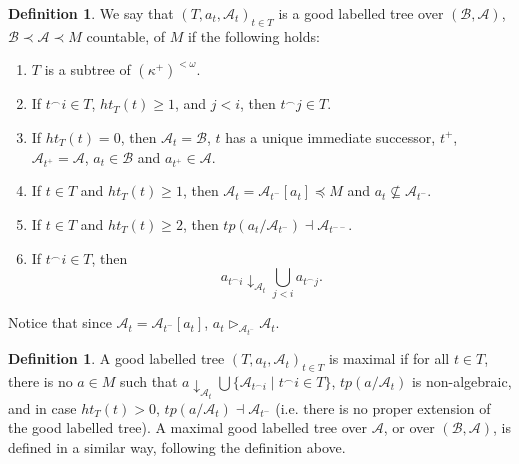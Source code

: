 \documentclass[12pt,a4paper]{amsart}
\theoremstyle{definition}
\newtheorem{defn}[thm]{Definition}
\theoremstyle{remark}
\renewcommand{\mid}{\mathrel{|}\allowbreak}
\begin{document}
\begin{defn}\label{good_labelled_tree}
    We say that $(T,a_t,\mathcal{A}_t)_{t\in T}$ is a good labelled tree over $(\mathcal{B},\mathcal{A})$, $\mathcal{B}\prec\mathcal{A}\prec M$ countable, of $M$ if the following holds:
    \begin{enumerate}
        \item $T$ is a subtree of $(\kappa^+)^{<\omega}$.
        \item If $t^\frown i\in T$, $ht_T(t)\ge 1$, and $j<i$, then $t^\frown j\in T$.
        \item If $ht_T(t)=0$, then $\mathcal{A}_{t}=\mathcal{B}$, $t$ has a unique immediate successor, $t^+$, $\mathcal{A}_{t^+}=\mathcal{A}$, $a_t\in \mathcal{B}$ and $a_{t^+}\in \mathcal{A}$.
        \item If $t\in T$ and $ht_T(t)\ge 1$, then $\mathcal{A}_t =\mathcal{A}_{t^-}[a_t]\preceq M$ and $a_t\not \subseteq\mathcal{A}_{t^-}$.
        \item If $t\in T$ and $ht_T(t)\ge 2$, then $tp(a_t / \mathcal{A}_{t^-})\dashv \mathcal{A}_{t^{--}}$.%
        \item If $t^\frown i\in T$, then $$a_{t^\frown i}\downarrow_{\mathcal{A}_t} \bigcup_{j<i}a_{t^\frown j}.$$
    \end{enumerate}
\end{defn}

Notice that since $\mathcal{A}_t =\mathcal{A}_{t^-}[a_t]$, $a_t\triangleright_{\mathcal{A}_{t^-}}\mathcal{A}_t$.

\begin{defn}
        A good labelled tree $(T, a_t, \mathcal{A}_t)_{t\in T}$ is maximal if for all $t\in T$, there is no $a\in M$ such that $a\downarrow_{\mathcal{A}_t}\bigcup\{\mathcal{A}_{t^\frown i}\mid t^\frown i\in T\}$, $tp(a/\mathcal{A}_{t})$ is non-algebraic, and in case $ht_T(t)>0$, $tp(a/\mathcal{A}_{t})\dashv\mathcal{A}_{t^{-}}$ (i.e. there is no proper extension of the good labelled tree). A maximal good labelled tree over $\mathcal{A}$, or over $(\mathcal{B},\mathcal{A})$, is defined in a similar way, following the definition above.

\end{defn}
\end{document}
